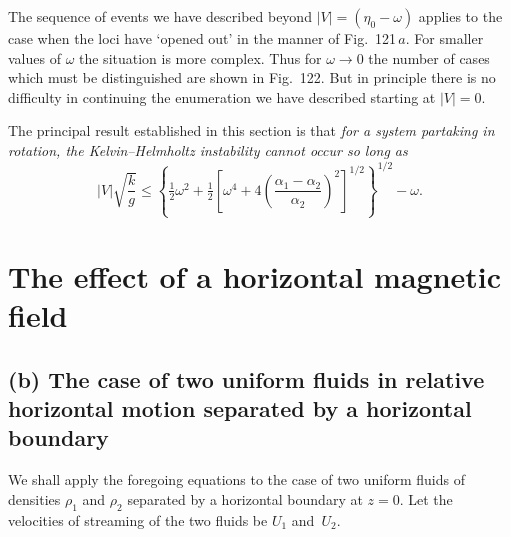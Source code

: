 
The sequence of events we have described beyond $|V| = (\eta_0-\omega)$ applies to the case when the loci have `opened out' in the manner of Fig.~121\,$a$. For smaller values of $\omega$ the situation is more complex. Thus for $\omega \to 0$ the number of cases which must be distinguished are shown in Fig.~122. But in principle there is no difficulty in continuing the enumeration we have described starting at $|V| = 0$.

The principal result established in this section is that \textit{for a system partaking in rotation, the Kelvin--Helmholtz instability cannot occur so long as}
\begin{equation}
\label{eq:11-179}
|V|\sqrt{\frac{k}{g}} \leqslant \left\{\tfrac{1}{2}\omega^2+\tfrac{1}{2}\!\left[\omega^4+4\!\left(\frac{\alpha_1-\alpha_2}{\alpha_2}\right)^{\!2}\right]^{1/2}\right\}^{1/2}\!\!-\omega.
\end{equation}

\section{The effect of a horizontal magnetic field}\label{sec:106}


\subsection*{(b) The case of two uniform fluids in relative horizontal
  motion separated by a horizontal boundary}

We shall apply the foregoing equations to the case of two uniform
fluids of densities $\rho_1$ and $\rho_2$ separated by a horizontal boundary
at $z=0$.  Let the velocities of streaming of the two fluids be $U_1$
and~$U_2$.

